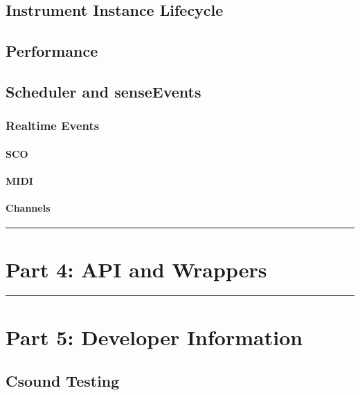 \subsection{Instrument Instance Lifecycle}

\subsection{Performance}

\subsection{Scheduler and senseEvents}

\subsubsection{Realtime Events}

\paragraph{SCO}

\paragraph{MIDI}

\paragraph{Channels}

\begin{center}\rule{3in}{0.4pt}\end{center}

\section{Part 4: API and Wrappers}

\begin{center}\rule{3in}{0.4pt}\end{center}

\section{Part 5: Developer Information}

\subsection{Csound Testing}

